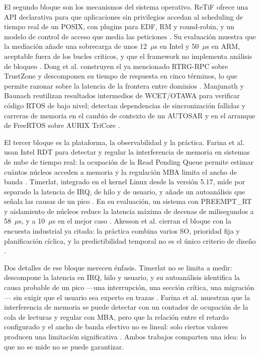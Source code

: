 \documentclass[journal]{IEEEtran}
\begin{document}
El segundo bloque son los mecanismos del sistema operativo. ReTiF ofrece una API declarativa para que aplicaciones sin privilegios accedan al scheduling de tiempo real de un POSIX, con plugins para EDF, RM y round-robin, y un modelo de control de acceso que media las peticiones \cite{serra2021retif}. Su evaluación muestra que la mediación añade una sobrecarga de unos 12~$\mu$s en Intel y 50~$\mu$s en ARM, aceptable fuera de los bucles críticos, y que el framework no implementa análisis de bloqueo \cite{serra2021retif}. Dong et al. construyen el ya mencionado RTRG-RPC sobre TrustZone y descomponen su tiempo de respuesta en cinco términos, lo que permite razonar sobre la latencia de la frontera entre dominios \cite{dong2020build}. Manjunath y Baunach reutilizan resultados intermedios de WCET/OTAWA para verificar código RTOS de bajo nivel; detectan dependencias de sincronización fallidas y carreras de memoria en el cambio de contexto de un AUTOSAR y en el arranque de FreeRTOS sobre AURIX TriCore \cite{manjunath2024framework}.

El tercer bloque es la plataforma, la observabilidad y la práctica. Farina et al. usan Intel RDT para detectar y regular la interferencia de memoria en sistemas de nube de tiempo real: la ocupación de la Read Pending Queue permite estimar cuántos núcleos acceden a memoria y la regulación MBA limita el ancho de banda \cite{farina2023enabling}. Timerlat, integrado en el kernel Linux desde la versión 5.17, mide por separado la latencia de IRQ, de hilo y de usuario, y añade un autoanálisis que señala las causas de un pico \cite{deoliveira2025timerlat}. En su evaluación, un sistema con PREEMPT\_RT y aislamiento de núcleos reduce la latencia máxima de decenas de milisegundos a 58~$\mu$s, y a 10~$\mu$s en el mejor caso \cite{deoliveira2025timerlat}. Akesson et al. cierran el bloque con la encuesta industrial ya citada: la práctica combina varios SO, prioridad fija y planificación cíclica, y la predictibilidad temporal no es el único criterio de diseño \cite{akesson2022survey}.

Dos detalles de ese bloque merecen énfasis. Timerlat no se limita a medir: descompone la latencia en IRQ, hilo y usuario, y su autoanálisis identifica la causa probable de un pico ---una interrupción, una sección crítica, una migración--- sin exigir que el usuario sea experto en trazas \cite{deoliveira2025timerlat}. Farina et al. muestran que la interferencia de memoria se puede detectar con un contador de ocupación de la cola de lecturas y regular con MBA, pero que la relación entre el retardo configurado y el ancho de banda efectivo no es lineal: solo ciertos valores producen una limitación significativa \cite{farina2023enabling}. Ambos trabajos comparten una idea: lo que no se mide no se puede garantizar.
\end{document}
